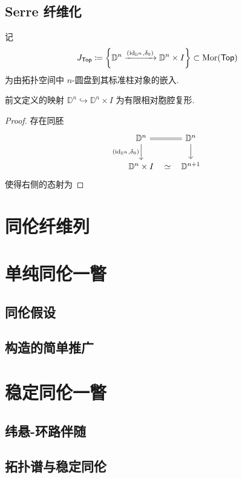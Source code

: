 \subsection{Serre 纤维化}
\begin{definition}
    记
    \[
    J_{\mathsf{Top}} \coloneqq \left\{\mathbb{D}^n \xrightarrow{(\mathrm{id}_{\mathbb{D}^n},\delta_0)} \mathbb{D}^n \times I\right\}\subset \operatorname{Mor}(\mathsf{Top})
    \]
    为由拓扑空间中 $n$-圆盘到其标准柱对象的嵌入.
\end{definition}
\begin{lemma}
    前文定义的映射 $\mathbb{D}^n \hookrightarrow \mathbb{D}^n \times I$ 为有限相对胞腔复形.
\end{lemma}
\begin{proof}
    存在同胚
    \[\begin{tikzcd}
	{\mathbb{D}^n} & {\mathbb{D}^n} \\
	{\mathbb{D}^n\times I} & {\mathbb{D}^{n+1}}
	\arrow[equal,from=1-1, to=1-2]
	\arrow["{(\identity_{\mathbb{D}^n},\delta_0)}"', from=1-1, to=2-1]
	\arrow[from=1-2, to=2-2]
	\arrow["\simeq"{marking, allow upside down}, draw=none, from=2-1, to=2-2]
    \end{tikzcd}\]
    使得右侧的态射为
\end{proof}
\section{同伦纤维列}
\section{单纯同伦一瞥}
\subsection{同伦假设}
\subsection{构造的简单推广}
\section{稳定同伦一瞥}\label{稳定同伦一瞥}
\subsection{纬悬-环路伴随}
\subsection{拓扑谱与稳定同伦}